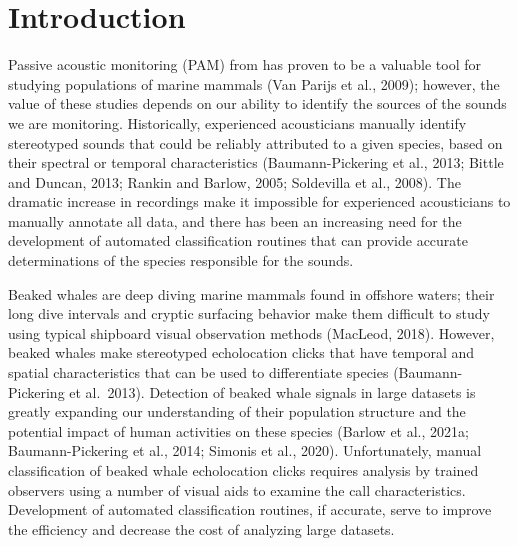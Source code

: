 \documentclass[
  authoryear,
  preprint,
  3p]{elsarticle}
\begin{document}
    \ifdefined\Shaded\renewenvironment{Shaded}{\begin{tcolorbox}[enhanced, boxrule=0pt, frame hidden, borderline west={3pt}{0pt}{shadecolor}, interior hidden, breakable, sharp corners]}{\end{tcolorbox}}\fi

\hypertarget{introduction}{%
\section{Introduction}\label{introduction}}

Passive acoustic monitoring (PAM) from has proven to be a valuable tool
for studying populations of marine mammals (Van Parijs et al., 2009);
however, the value of these studies depends on our ability to identify
the sources of the sounds we are monitoring. Historically, experienced
acousticians manually identify stereotyped sounds that could be reliably
attributed to a given species, based on their spectral or temporal
characteristics (Baumann-Pickering et al., 2013; Bittle and Duncan,
2013; Rankin and Barlow, 2005; Soldevilla et al., 2008). The dramatic
increase in recordings make it impossible for experienced acousticians
to manually annotate all data, and there has been an increasing need for
the development of automated classification routines that can provide
accurate determinations of the species responsible for the sounds.

Beaked whales are deep diving marine mammals found in offshore waters;
their long dive intervals and cryptic surfacing behavior make them
difficult to study using typical shipboard visual observation methods
(MacLeod, 2018). However, beaked whales make stereotyped echolocation
clicks that have temporal and spatial characteristics that can be used
to differentiate species (Baumann-Pickering et al.~2013). Detection of
beaked whale signals in large datasets is greatly expanding our
understanding of their population structure and the potential impact of
human activities on these species (Barlow et al., 2021a;
Baumann-Pickering et al., 2014; Simonis et al., 2020). Unfortunately,
manual classification of beaked whale echolocation clicks requires
analysis by trained observers using a number of visual aids to examine
the call characteristics. Development of automated classification
routines, if accurate, serve to improve the efficiency and decrease the
cost of analyzing large datasets.
\end{document}
